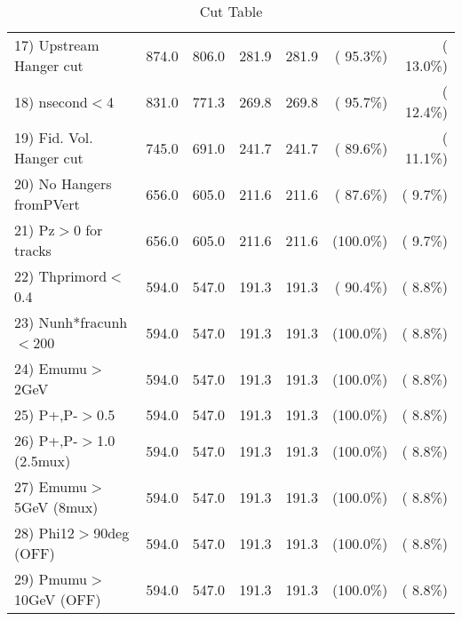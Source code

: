 \begin{table}[h!]
\begin{tabular}{||l||r|r|r|r|r|r||}
 17) Upstream Hanger cut  &        874.0 &        806.0 &        281.9 &        281.9 & ( 95.3\%) & ( 13.0\%) \\
 18) nsecond$<$4          &        831.0 &        771.3 &        269.8 &        269.8 & ( 95.7\%) & ( 12.4\%) \\
 19) Fid. Vol. Hanger cut &        745.0 &        691.0 &        241.7 &        241.7 & ( 89.6\%) & ( 11.1\%) \\
 20) No Hangers fromPVert &        656.0 &        605.0 &        211.6 &        211.6 & ( 87.6\%) & (  9.7\%) \\
 21) Pz$>$0 for tracks    &        656.0 &        605.0 &        211.6 &        211.6 & (100.0\%) & (  9.7\%) \\
 22) Thprimord$<$0.4      &        594.0 &        547.0 &        191.3 &        191.3 & ( 90.4\%) & (  8.8\%) \\
 23) Nunh*fracunh$<$200   &        594.0 &        547.0 &        191.3 &        191.3 & (100.0\%) & (  8.8\%) \\
 24) Emumu$>$2GeV         &        594.0 &        547.0 &        191.3 &        191.3 & (100.0\%) & (  8.8\%) \\
 25) P+,P-$>$0.5          &        594.0 &        547.0 &        191.3 &        191.3 & (100.0\%) & (  8.8\%) \\
 26) P+,P-$>$1.0 (2.5mux) &        594.0 &        547.0 &        191.3 &        191.3 & (100.0\%) & (  8.8\%) \\
 27) Emumu$>$5GeV  (8mux) &        594.0 &        547.0 &        191.3 &        191.3 & (100.0\%) & (  8.8\%) \\
 28) Phi12$>$90deg  (OFF) &        594.0 &        547.0 &        191.3 &        191.3 & (100.0\%) & (  8.8\%) \\
 29) Pmumu$>$10GeV  (OFF) &        594.0 &        547.0 &        191.3 &        191.3 & (100.0\%) & (  8.8\%) \\
 \hline
 \hline
 \end{tabular}
 \caption{Cut Table           }
 \label{tab-cutcohjpsi-mumu_ccdis}
 \end{table}
